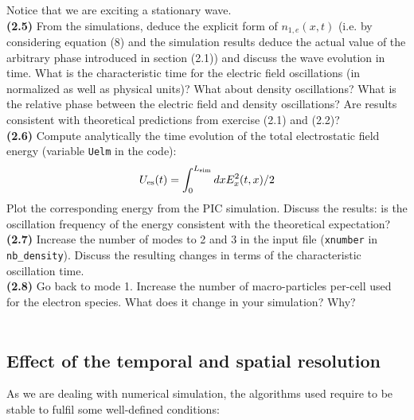 \documentclass[11pt,a4paper]{article}
\begin{document}
Notice that we are exciting a stationary wave. \\
{\bf (2.5)} From the simulations, deduce the explicit form of $n_{1,e}(x,t)$ (i.e. by considering equation (8) and the simulation results deduce the actual value of the arbitrary  phase introduced in section (2.1)) and discuss the wave evolution in time. What is the characteristic time for the electric field oscillations (in normalized as well as physical units)? What about density oscillations? What is the relative phase between the electric field and density oscillations?  Are results consistent with theoretical predictions from exercise (2.1) and (2.2)?\\
{\bf (2.6)} Compute analytically the time evolution of the total electrostatic field energy (variable  \texttt{Uelm} in the code):
$$U_{\rm es}(t) = \int_{0}^{L_{\rm sim}} dx E_x^2(t,x)/2$$
Plot the corresponding energy from the PIC simulation. Discuss the results: is the oscillation frequency of the energy consistent with the theoretical expectation?\\
{\bf (2.7)} Increase the number of modes to 2 and 3 in the input file (\texttt{xnumber} in \texttt{nb\_density}). Discuss the resulting changes in terms of the characteristic oscillation time.\\
{\bf (2.8)} Go back to mode 1. Increase the number of macro-particles per-cell used for the electron species. What does it change in your simulation? Why?\\
 \\

\subsection*{Effect of the temporal and spatial resolution}

As we are dealing with numerical simulation, the algorithms used require to be stable to fulfil some well-defined conditions:\\
\end{document}
